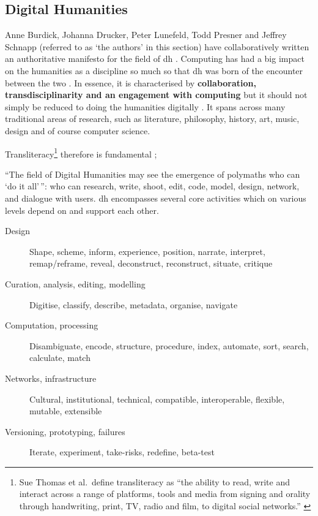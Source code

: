 

\subsection*{Digital Humanities}

Anne Burdick, Johanna Drucker, Peter Lunefeld, Todd Presner and Jeff\-rey Schn\-app (referred to as `the authors' in this section) have collaboratively written an authoritative manifesto for the field of \gls{dh} \autocite{Burdick2012}. Computing has had a big impact on the humanities as a discipline so much so that \gls{dh} was born of the encounter between the two \autocite[p.3]{Burdick2012}. In essence, it is characterised by \textbf{collaboration, transdisciplinarity and an engagement with computing} \autocite[p.122]{Burdick2012} but it should not simply be reduced to doing the humanities digitally \autocite[p.101]{Burdick2012}. It spans across many traditional areas of research, such as literature, philosophy, history, art, music, design and of course computer science.

\begin{draft}
  Transliteracy\footnote{Sue Thomas et al.\ define transliteracy as ``the ability to read, write and interact across a range of platforms, tools and media from signing and orality through handwriting, print, TV, radio and film, to digital social networks.'' \autocite{Thomas2007}} therefore is fundamental \autocite{Thomas2007};
\end{draft}

``The field of Digital Humanities may see the emergence of polymaths who can `do it all'\,'': who can research, write, shoot, edit, code, model, design, network, and dialogue with users. \autocite[p.15]{Burdick2012} \gls{dh} encompasses several core activities which on various levels depend on and support each other.

\begin{description}
  \item [Design] Shape, scheme, inform, experience, position, narrate,
  					interpret, remap/reframe, reveal, deconstruct, reconstruct,
  					situate, critique
  \item [Curation, analysis, editing, modelling] Digitise, classify, describe, metadata, organise, navigate
  \item [Computation, processing] Disambiguate, encode, structure, procedure, index, automate, sort, search, calculate, match
  \item [Networks, infrastructure] Cultural, institutional, technical, compatible, interoperable, flexible, mutable, extensible
  \item [Versioning, prototyping, failures]	Iterate, experiment, take-risks, redefine, beta-test
\end{description}

